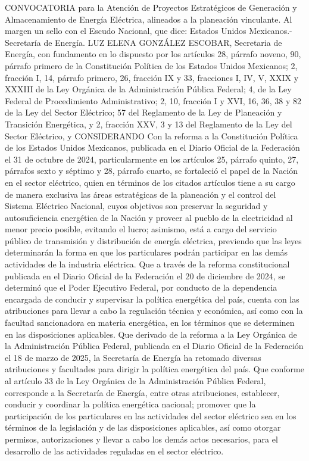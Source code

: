 \begingroup
\senertexto
CONVOCATORIA para la Atención de Proyectos Estratégicos de Generación y Almacenamiento de Energía Eléctrica, alineados a la planeación vinculante.
Al margen un sello con el Escudo Nacional, que dice: Estados Unidos Mexicanos.- Secretaría de Energía.
LUZ ELENA GONZÁLEZ ESCOBAR, Secretaria de Energía, con fundamento en lo dispuesto por los artículos 28, párrafo noveno, 90, párrafo primero de la Constitución Política de los Estados Unidos Mexicanos; 2, fracción I, 14, párrafo primero, 26, fracción IX y 33, fracciones I, IV, V, XXIX y XXXIII de la Ley Orgánica de la Administración Pública Federal; 4, de la Ley Federal de Procedimiento Administrativo; 2, 10, fracción I y XVI, 16, 36, 38 y 82 de la Ley del Sector Eléctrico; 57 del Reglamento de la Ley de Planeación y Transición Energética, y 2, fracción XXV, 3 y 13 del Reglamento de la Ley del Sector Eléctrico, y
CONSIDERANDO
Con la reforma a la Constitución Política de los Estados Unidos Mexicanos, publicada en el Diario Oficial de la Federación el 31 de octubre de 2024, particularmente en los artículos 25, párrafo quinto, 27, párrafos sexto y séptimo y 28, párrafo cuarto, se fortaleció el papel de la Nación en el sector eléctrico, quien en términos de los citados artículos tiene a su cargo de manera exclusiva las áreas estratégicas de la planeación y el control del Sistema Eléctrico Nacional, cuyos objetivos son preservar la seguridad y autosuficiencia energética de la Nación y proveer al pueblo de la electricidad al menor precio posible, evitando el lucro; asimismo, está a cargo del servicio público de transmisión y distribución de energía eléctrica, previendo que las leyes determinarán la forma en que los particulares podrán participar en las demás actividades de la industria eléctrica.
Que a través de la reforma constitucional publicada en el Diario Oficial de la Federación el 20 de diciembre de 2024, se determinó que el Poder Ejecutivo Federal, por conducto de la dependencia encargada de conducir y supervisar la política energética del país, cuenta con las atribuciones para llevar a cabo la regulación técnica y económica, así como con la facultad sancionadora en materia energética, en los términos que se determinen en las disposiciones aplicables.
Que derivado de la reforma a la Ley Orgánica de la Administración Pública Federal, publicada en el Diario Oficial de la Federación el 18 de marzo de 2025, la Secretaría de Energía ha retomado diversas atribuciones y facultades para dirigir la política energética del país.
Que conforme al artículo 33 de la Ley Orgánica de la Administración Pública Federal, corresponde a la Secretaría de Energía, entre otras atribuciones, establecer, conducir y coordinar la política energética nacional; promover que la participación de los particulares en las actividades del sector eléctrico sea en los términos de la legislación y de las disposiciones aplicables, así como otorgar permisos, autorizaciones y llevar a cabo los demás actos necesarios, para el desarrollo de las actividades reguladas en el sector eléctrico.
